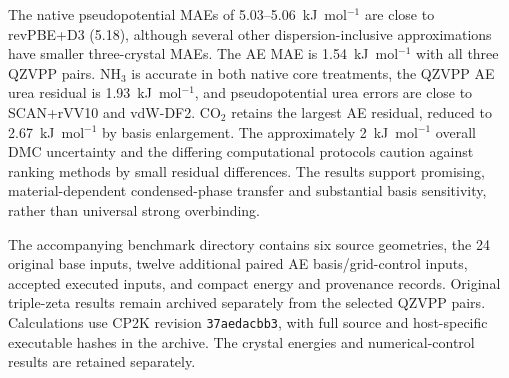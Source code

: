 The native pseudopotential MAEs of 5.03--5.06~kJ~mol$^{-1}$ are close to revPBE+D3 (5.18), although several other dispersion-inclusive approximations have smaller three-crystal MAEs. The AE MAE is 1.54~kJ~mol$^{-1}$ with all three QZVPP pairs. NH$_3$ is accurate in both native core treatments, the QZVPP AE urea residual is 1.93~kJ~mol$^{-1}$, and pseudopotential urea errors are close to SCAN+rVV10 and vdW-DF2. CO$_2$ retains the largest AE residual, reduced to 2.67~kJ~mol$^{-1}$ by basis enlargement. The approximately 2~kJ~mol$^{-1}$ overall DMC uncertainty and the differing computational protocols caution against ranking methods by small residual differences.\cite{DellaPia2024X23} The results support promising, material-dependent condensed-phase transfer and substantial basis sensitivity, rather than universal strong overbinding.

The accompanying benchmark directory contains six source geometries, the 24 original base inputs, twelve additional paired AE basis/grid-control inputs, accepted executed inputs, and compact energy and provenance records. Original triple-zeta results remain archived separately from the selected QZVPP pairs. Calculations use CP2K revision \texttt{37aedacbb3}, with full source and host-specific executable hashes in the archive. The crystal energies and numerical-control results are retained separately.
